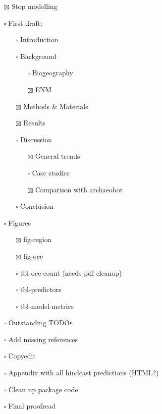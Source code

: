 \documentclass[
  authoryear,
  preprint]{elsarticle}
\providecommand{\tightlist}{%
  \setlength{\itemsep}{0pt}\setlength{\parskip}{0pt}}\usepackage{longtable,booktabs,array}
\begin{document}
\begin{itemize}
\tightlist
\item[$\boxtimes$]
  Stop modelling
\item[$\square$]
  First draft:

  \begin{itemize}
  \tightlist
  \item[$\square$]
    Introduction
  \item[$\square$]
    Background

    \begin{itemize}
    \tightlist
    \item[$\square$]
      Biogeography
    \item[$\boxtimes$]
      ENM
    \end{itemize}
  \item[$\boxtimes$]
    Methods \& Materials
  \item[$\boxtimes$]
    Results
  \item[$\square$]
    Discussion

    \begin{itemize}
    \tightlist
    \item[$\boxtimes$]
      General trends
    \item[$\square$]
      Case studies
    \item[$\boxtimes$]
      Comparison with archaeobot
    \end{itemize}
  \item[$\square$]
    Conclusion
  \end{itemize}
\item[$\square$]
  Figures

  \begin{itemize}
  \tightlist
  \item[$\boxtimes$]
    fig-region
  \item[$\boxtimes$]
    fig-occ
  \item[$\square$]
    tbl-occ-count (needs pdf cleanup)
  \item[$\square$]
    tbl-predictors
  \item[$\square$]
    tbl-model-metrics
  \end{itemize}
\item[$\square$]
  Outstanding TODOs
\item[$\square$]
  Add missing references
\item[$\square$]
  Copyedit
\item[$\square$]
  Appendix with all hindcast predictions (HTML?)
\item[$\square$]
  Clean up package code
\item[$\square$]
  Final proofread
\end{itemize}
\end{document}
